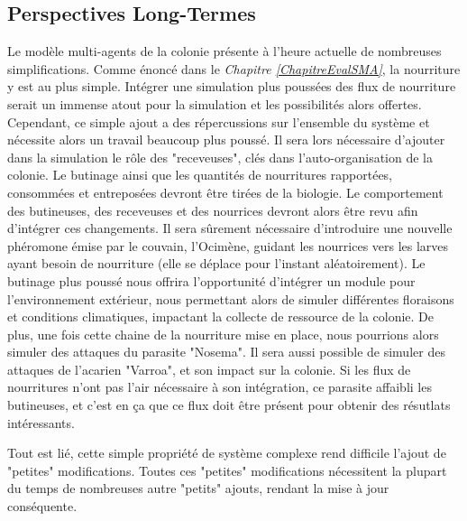 	\subsection{Perspectives Long-Termes}
	Le modèle multi-agents de la colonie présente à l'heure actuelle de nombreuses simplifications. Comme énoncé dans le \textit{Chapitre \ref{ChapitreEvalSMA}}, la nourriture y est au plus simple. Intégrer une simulation plus poussées des flux de nourriture serait un immense atout pour la simulation et les possibilités alors offertes. Cependant, ce simple ajout a des répercussions sur l'ensemble du système et nécessite alors un travail beaucoup plus poussé. Il sera lors nécessaire d'ajouter dans la simulation le rôle des "receveuses", clés dans l'auto-organisation de la colonie. Le butinage ainsi que les quantités de nourritures rapportées, consommées et entreposées devront être tirées de la biologie. Le comportement des butineuses, des receveuses et des nourrices devront alors être revu afin d'intégrer ces changements. Il sera sûrement nécessaire d'introduire une nouvelle phéromone émise par le couvain, l'Ocimène, guidant les nourrices vers les larves ayant besoin de nourriture (elle se déplace pour l'instant aléatoirement). Le butinage plus poussé nous offrira l'opportunité d'intégrer un module pour l'environnement extérieur, nous permettant alors de simuler différentes floraisons et conditions climatiques, impactant la collecte de ressource de la colonie. De plus, une fois cette chaine de la nourriture mise en place, nous pourrions alors simuler des attaques du parasite "Nosema". Il sera aussi possible de simuler des attaques de l'acarien "Varroa", et son impact sur la colonie. Si les flux de nourritures n'ont pas l'air nécessaire à son intégration, ce parasite affaibli les butineuses, et c'est en ça que ce flux doit être présent pour obtenir des résutlats intéressants.
	
	Tout est lié, cette simple propriété de système complexe rend difficile l'ajout de "petites" modifications. Toutes ces "petites" modifications nécessitent la plupart du temps de nombreuses autre "petits" ajouts, rendant la mise à jour conséquente.
	